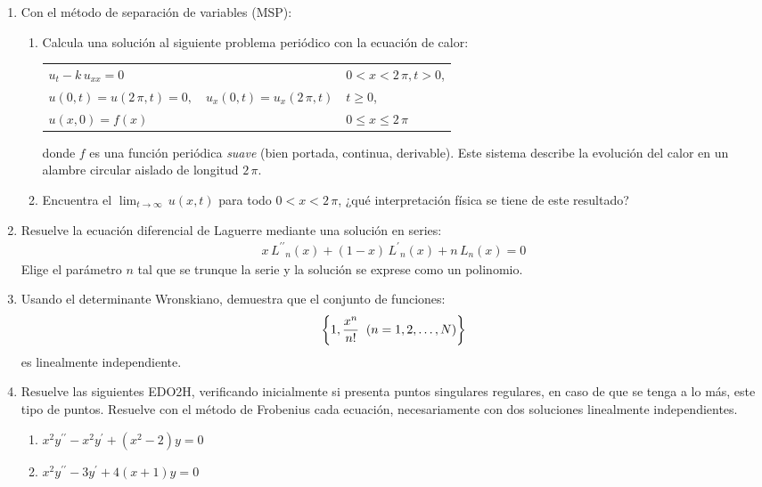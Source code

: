 \documentclass[hidelinks,12pt]{article}
\newcommand{\pderivada}[1]{\ensuremath{{#1}^{\prime}}}
\newcommand{\sderivada}[1]{\ensuremath{{#1}^{\prime \prime}}}
\begin{document}
\begin{enumerate}
\item Con el método de separación de variables (MSP): 
\begin{enumerate}[label=\roman*)]
\item Calcula una solución al siguiente problema periódico con la ecuación de calor:
\begin{table}[H]
\centering
\large
\begin{tabular}{l l}
$u_{t} - k \, u_{xx} = 0$ & $0 < x < 2 \, \pi,  t > 0$, \\
$u(0, t) = u(2 \, \pi, t) = 0, \quad u_{x} (0, t) = u_{x}(2 \, \pi, t)$ & $t \geq 0$, \\
$u(x, 0) = f(x)$ & $0 \leq x \leq 2 \, \pi$
\end{tabular}
\end{table}
donde $f$ es una función periódica \emph{suave} (bien portada, continua, derivable). Este sistema describe la evolución del calor en un alambre circular aislado de longitud $2 \, \pi$.
\item Encuentra el $\displaystyle{\lim_{t \to \infty}} \, u(x, t)$ para todo $0 < x < 2 \, \pi$, ¿qué interpretación física se tiene de este resultado?
\end{enumerate}
\item Resuelve la ecuación diferencial de Laguerre mediante una solución en series:
\begin{align*}
x \, \sderivada{L}_{n} (x) + (1 - x) \, \pderivada{L}_{n} (x) + n \, L_{n} (x) = 0
\end{align*}
Elige el parámetro $n$ tal que se trunque la serie y la solución se exprese como un polinomio.
\item Usando el determinante Wronskiano, demuestra que el conjunto de funciones:
\begin{align*}
\left\{ 1, \dfrac{x^{n}}{n!} \hspace{0.2cm} (n = 1, 2, \ldots, N) \right\}
\end{align*}
es linealmente independiente.
\item Resuelve las siguientes EDO2H, verificando inicialmente si presenta puntos singulares regulares, en caso de que se tenga a lo más, este tipo de puntos. Resuelve con el método de Frobenius cada ecuación, necesariamente con dos soluciones linealmente independientes.
\begin{enumerate}[label=\roman*)]
\item $x^{2} \sderivada{y} - x^{2} \pderivada{y} + (x^{2} - 2) y = 0$
\item $x^{2} \sderivada{y} - 3 \pderivada{y} + 4(x + 1) y = 0$
\end{enumerate}
\end{enumerate}
\end{document}

